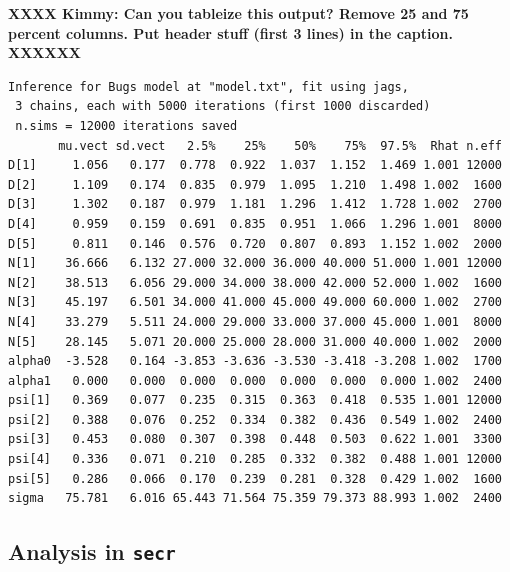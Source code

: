 {\bf XXXX Kimmy: Can you tableize this output?  Remove 25 and 75
  percent columns. Put header stuff (first 3 lines) in the caption. XXXXXX}
{\small
\begin{verbatim}
Inference for Bugs model at "model.txt", fit using jags,
 3 chains, each with 5000 iterations (first 1000 discarded)
 n.sims = 12000 iterations saved
       mu.vect sd.vect   2.5%    25%    50%    75%  97.5%  Rhat n.eff
D[1]     1.056   0.177  0.778  0.922  1.037  1.152  1.469 1.001 12000
D[2]     1.109   0.174  0.835  0.979  1.095  1.210  1.498 1.002  1600
D[3]     1.302   0.187  0.979  1.181  1.296  1.412  1.728 1.002  2700
D[4]     0.959   0.159  0.691  0.835  0.951  1.066  1.296 1.001  8000
D[5]     0.811   0.146  0.576  0.720  0.807  0.893  1.152 1.002  2000
N[1]    36.666   6.132 27.000 32.000 36.000 40.000 51.000 1.001 12000
N[2]    38.513   6.056 29.000 34.000 38.000 42.000 52.000 1.002  1600
N[3]    45.197   6.501 34.000 41.000 45.000 49.000 60.000 1.002  2700
N[4]    33.279   5.511 24.000 29.000 33.000 37.000 45.000 1.001  8000
N[5]    28.145   5.071 20.000 25.000 28.000 31.000 40.000 1.002  2000
alpha0  -3.528   0.164 -3.853 -3.636 -3.530 -3.418 -3.208 1.002  1700
alpha1   0.000   0.000  0.000  0.000  0.000  0.000  0.000 1.002  2400
psi[1]   0.369   0.077  0.235  0.315  0.363  0.418  0.535 1.001 12000
psi[2]   0.388   0.076  0.252  0.334  0.382  0.436  0.549 1.002  2400
psi[3]   0.453   0.080  0.307  0.398  0.448  0.503  0.622 1.001  3300
psi[4]   0.336   0.071  0.210  0.285  0.332  0.382  0.488 1.001 12000
psi[5]   0.286   0.066  0.170  0.239  0.281  0.328  0.429 1.002  1600
sigma   75.781   6.016 65.443 71.564 75.359 79.373 88.993 1.002  2400
\end{verbatim}
}


\subsection{Analysis in \mbox{\tt secr} }


